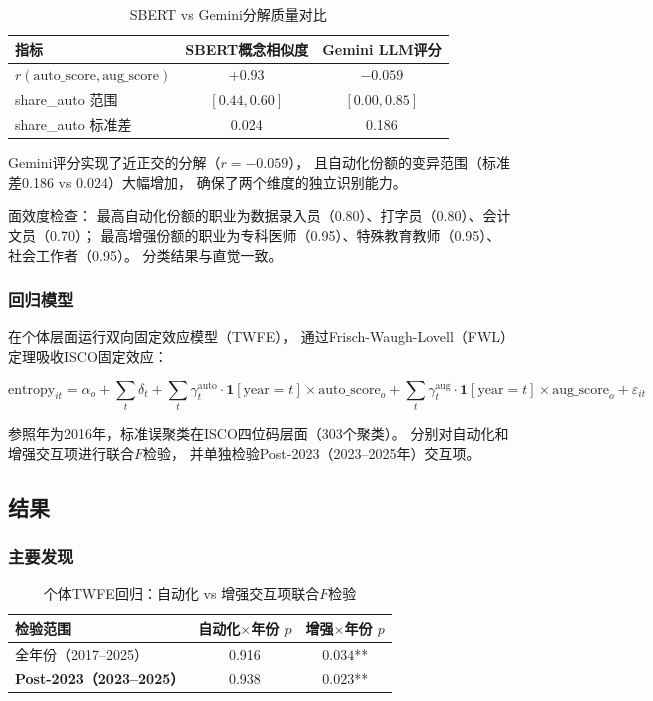 \documentclass[12pt,a4paper]{ctexart}
\begin{document}
\begin{table}[h!]
\centering
\caption{SBERT vs Gemini分解质量对比}
\label{tab:decomp_quality}
\begin{tabular}{lcc}
\toprule
指标 & SBERT概念相似度 & Gemini LLM评分 \\
\midrule
$r(\text{auto\_score}, \text{aug\_score})$ & $+0.93$ & $\mathbf{-0.059}$ \\
share\_auto 范围 & $[0.44, 0.60]$ & $[0.00, 0.85]$ \\
share\_auto 标准差 & 0.024 & 0.186 \\
\bottomrule
\end{tabular}
\end{table}

Gemini评分实现了近正交的分解（$r=-0.059$），
且自动化份额的变异范围（标准差0.186 vs 0.024）大幅增加，
确保了两个维度的独立识别能力。

面效度检查：
最高自动化份额的职业为数据录入员（0.80）、打字员（0.80）、会计文员（0.70）；
最高增强份额的职业为专科医师（0.95）、特殊教育教师（0.95）、社会工作者（0.95）。
分类结果与直觉一致。

\subsubsection{回归模型}

在个体层面运行双向固定效应模型（TWFE），
通过Frisch-Waugh-Lovell（FWL）定理吸收ISCO固定效应：

\begin{equation}
\text{entropy}_{it} = \alpha_o + \sum_t \delta_t
+ \sum_{t} \gamma_t^{\text{auto}} \cdot \mathbf{1}[\text{year}=t] \times \text{auto\_score}_o
+ \sum_{t} \gamma_t^{\text{aug}} \cdot \mathbf{1}[\text{year}=t] \times \text{aug\_score}_o
+ \varepsilon_{it}
\label{eq:twfe_auto_aug}
\end{equation}

参照年为2016年，标准误聚类在ISCO四位码层面（303个聚类）。
分别对自动化和增强交互项进行联合$F$检验，
并单独检验Post-2023（2023--2025年）交互项。

\subsection{结果}

\subsubsection{主要发现}

\begin{table}[h!]
\centering
\caption{个体TWFE回归：自动化 vs 增强交互项联合$F$检验}
\label{tab:gemini_joint_f}
\begin{tabular}{lcc}
\toprule
检验范围 & 自动化$\times$年份 $p$ & 增强$\times$年份 $p$ \\
\midrule
全年份（2017--2025） & 0.916 & $\mathbf{0.034}$** \\
\textbf{Post-2023（2023--2025）} & 0.938 & $\mathbf{0.023}$** \\
\bottomrule
\end{tabular}
\end{table}
\end{document}
